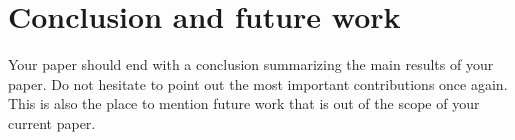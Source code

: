 \section{Conclusion and future work}
Your paper should end with a conclusion summarizing the main results of your
paper.
Do not hesitate to point out the most important contributions once again.
This is also the place to mention future work that is out of the scope of your
current paper.

